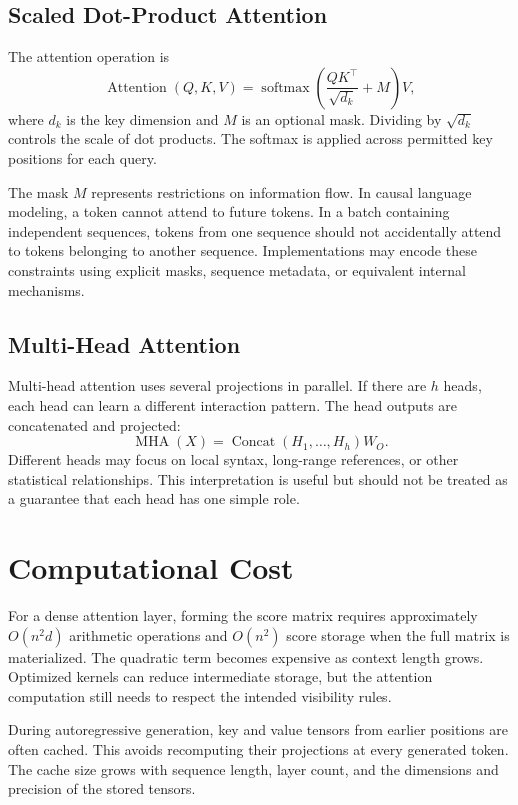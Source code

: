 \documentclass{article}
\begin{document}
\subsection{Scaled Dot-Product Attention}
The attention operation is
\begin{equation}
\operatorname{Attention}(Q,K,V)
=\operatorname{softmax}\left(\frac{QK^\top}{\sqrt{d_k}}+M\right)V,
\end{equation}
where $d_k$ is the key dimension and $M$ is an optional mask. Dividing by $\sqrt{d_k}$ controls the scale of dot products. The softmax is applied across permitted key positions for each query.

The mask $M$ represents restrictions on information flow. In causal language modeling, a token cannot attend to future tokens. In a batch containing independent sequences, tokens from one sequence should not accidentally attend to tokens belonging to another sequence. Implementations may encode these constraints using explicit masks, sequence metadata, or equivalent internal mechanisms.

\subsection{Multi-Head Attention}
Multi-head attention uses several projections in parallel. If there are $h$ heads, each head can learn a different interaction pattern. The head outputs are concatenated and projected:
\begin{equation}
\operatorname{MHA}(X)=
\operatorname{Concat}(H_1,\ldots,H_h)W_O.
\end{equation}
Different heads may focus on local syntax, long-range references, or other statistical relationships. This interpretation is useful but should not be treated as a guarantee that each head has one simple role.

\section{Computational Cost}
For a dense attention layer, forming the score matrix requires approximately $O(n^2d)$ arithmetic operations and $O(n^2)$ score storage when the full matrix is materialized. The quadratic term becomes expensive as context length grows. Optimized kernels can reduce intermediate storage, but the attention computation still needs to respect the intended visibility rules.

During autoregressive generation, key and value tensors from earlier positions are often cached. This avoids recomputing their projections at every generated token. The cache size grows with sequence length, layer count, and the dimensions and precision of the stored tensors.
\end{document}
